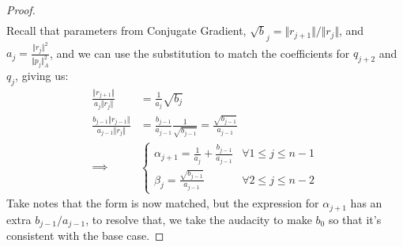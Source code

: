 \documentclass[]{article}
\theoremstyle{definition}
\begin{document}
\begin{proof}
\begin{align}
                \end{align}
                Recall that parameters from Conjugate Gradient, $\sqrt b_j = \Vert r_{j + 1}\Vert/\Vert r_j\Vert$, and $a_j = \frac{\Vert r_j\Vert^2}{\Vert p_j\Vert_A^2}$, and we can use the substitution to match the coefficients for $q_{j + 2}$ and $q_j$, giving us: 
                \begin{align}
                    \frac{\Vert r_{j + 1}\Vert}{a_j\Vert r_j\Vert} &= 
                    \frac{1}{a_j}\sqrt{b_j}
                    \\
                    \frac{b_{j - 1}\Vert r_{j - 1}\Vert}{a_{j - 1}\Vert r_j \Vert}
                    &= 
                    \frac{b_{j - 1}}{a_{j - 1}}\frac{1}{\sqrt{b_{j - 1}}}
                    = 
                    \frac{\sqrt{b_{j - 1}}}{a_{j - 1}}
                    \\
                    \implies& 
                    \begin{cases}
                        \alpha_{j + 1} = \frac{1}{a_j} + \frac{b_{j - 1}}{a_{j - 1}}
                        & \forall 1 \le j \le n - 1
                        \\
                        \beta_{j} = \frac{\sqrt{b_{j - 1}}}{a_{j - 1}}
                        & \forall 2 \le j \le n - 2 
                    \end{cases}
                \end{align}
                Take notes that the form is now matched, but the expression for $\alpha_{j + 1}$ has an extra $b_{j - 1}/a_{j - 1}$, to resolve that, we take the audacity to make $b_0$ so that it's consistent with the base case. 
            \end{proof}
\end{document}
